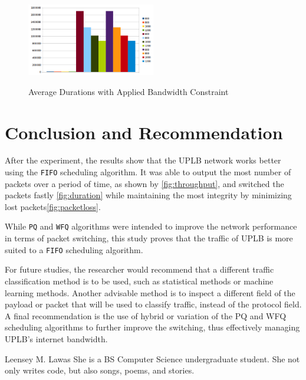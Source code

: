 \documentclass[journal]{IEEE/IEEEtran}
\newcommand{\ADVISEE}{Leensey M. Lawas}
\begin{document}
\begin{figure}
\includegraphics[width=0.5\textwidth]{duration_with_bc}
\label{fig:bc}\caption{Average Durations with Applied Bandwidth Constraint}
\end{figure}

\section{Conclusion and Recommendation}
After the experiment, the results show that the UPLB network works better using the \texttt{FIFO} scheduling algorithm. It was able to output the most number of packets over a period of time, as shown by \ref{fig:throughput}, and switched the packets fastly \ref{fig:duration} while maintaining the most integrity by minimizing lost packets\ref{fig:packetloss}.

While \texttt{PQ} and \texttt{WFQ} algorithms were intended to improve the network performance in terms of packet switching, this study proves that the traffic of UPLB is more suited to a \texttt{FIFO} scheduling algorithm.

For future studies, the researcher would recommend that a different traffic classification method is to be used, such as statistical methods or machine learning methods. Another advisable method is to inspect a different field of the payload or packet that will be used to classify traffic, instead of the protocol field. A final recommendation is the use of hybrid or variation of the PQ and WFQ scheduling algorithms to further improve the switching, thus effectively managing UPLB's internet bandwidth.




\begin{biography}{\ADVISEE}
She is a BS Computer Science undergraduate student. She not only writes code, but also songs, poems, and stories.
\end{biography}
\end{document}
